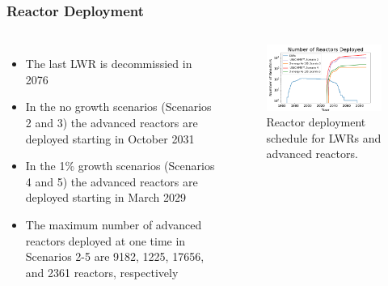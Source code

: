 \begin{frame}
    \frametitle{Reactor Deployment}
    \begin{columns}
        \column[t]{5cm}
        \begin{itemize}
            \item The last \gls{LWR} is decommissied in 2076
            \item In the no growth scenarios (Scenarios 2 and 3) the advanced reactors are 
                  deployed starting in October 2031
            \item In the 1\% growth scenarios (Scenarios 4 and 5) the advanced reactors are 
                  deployed starting in March 2029
            \item The maximum number of advanced reactors deployed at one time 
                  in Scenarios 2-5 are 9182, 1225, 17656, and 2361 reactors, respectively
        \end{itemize}

        \column[t]{5cm}
        \vspace{-1cm}
        \begin{figure}
            \centering 
            \includegraphics[scale=0.35]{figures/rxdeployment_scenarios_all.png}
            \caption{Reactor deployment schedule for \glspl{LWR} and 
            advanced reactors.}
            \label{fig:rx_deployment}
        \end{figure}
    \end{columns}
\end{frame}

